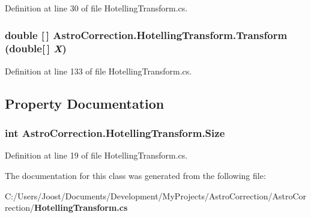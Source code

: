 Definition at line 30 of file HotellingTransform.cs.
\subsubsection[{Transform}]{\setlength{\rightskip}{0pt plus 5cm}double [$\,$] AstroCorrection.HotellingTransform.Transform (double[$\,$] {\em X})}\label{class_astro_correction_1_1_hotelling_transform_a7eb74ec91bb8f2f6c6800df7d00daad0}


Definition at line 133 of file HotellingTransform.cs.

\subsection{Property Documentation}
\subsubsection[{Size}]{\setlength{\rightskip}{0pt plus 5cm}int AstroCorrection.HotellingTransform.Size\hspace{0.3cm}{\ttfamily  [get, set]}}\label{class_astro_correction_1_1_hotelling_transform_a30f3433fd432028404f894b19de7dc57}


Definition at line 19 of file HotellingTransform.cs.

The documentation for this class was generated from the following file:\begin{DoxyCompactItemize}
\item 
C:/Users/Joost/Documents/Development/MyProjects/AstroCorrection/AstroCorrection/{\bf HotellingTransform.cs}\end{DoxyCompactItemize}
